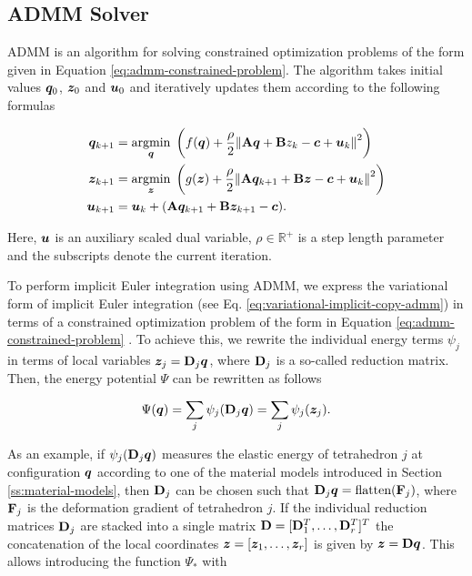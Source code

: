 \subsection{ADMM Solver}\label{ss:admm-solver}
ADMM is an algorithm for solving constrained optimization problems of the form given in Equation \ref{eq:admm-constrained-problem}. The algorithm takes initial values 
$\bm{q}_0$, $\bm{z}_0$ and $\bm{u}_0$ and iteratively updates them according to the following formulas \cite{gallier2020}

\begin{align}\label{eq:admm-general}
    \begin{split}
        \bm{q}_{k+1} &= \underset{\bm{q}}{\operatorname{argmin}}\; \left( f(\bm{q}) + \frac{\rho}{2}\norm{\mathbf{A}\bm{q} + \mathbf{B}{z}_k - \bm{c} + \bm{u}_k}^2 \right)\\ 
        \bm{z}_{k+1} &= \underset{\bm{z}}{\operatorname{argmin}}\; \left( g(\bm{z}) + \frac{\rho}{2}\norm{\mathbf{A}\bm{q}_{k+1} + \mathbf{B}\bm{z} - \bm{c} + \bm{u}_k}^2 \right)\\
        \bm{u}_{k+1} &= \bm{u}_{k} + (\mathbf{A}\bm{q}_{k+1} + \mathbf{B}\bm{z}_{k+1} - \bm{c}).
    \end{split}
\end{align}

\noindent Here, $\bm{u}$ is an auxiliary scaled dual variable, $\rho \in \mathbb{R}^+$ is a step length parameter and the subscripts denote the current iteration.

To perform implicit Euler integration using ADMM, we express the variational form of implicit Euler integration (see Eq. \ref{eq:variational-implicit-copy-admm}) in 
terms of a constrained optimization problem of the form in Equation \ref{eq:admm-constrained-problem} \cite{overby2017}. To achieve this, we rewrite the individual energy terms 
$\psi_j$ in terms of local variables $\bm{z}_j = \mathbf{D}_j\bm{q}$, where $\mathbf{D}_j$ is a so-called reduction matrix. Then, the energy potential 
$\Psi$ can be rewritten as follows

\[
    \Psi({\bm{q}}) = \sum_j \psi_j(\mathbf{D}_j \bm{q}) = \sum_j \psi_j(\bm{z}_j).
\]

\noindent As an example, if $\psi_j(\mathbf{D}_j\bm{q})$ measures the elastic energy of tetrahedron $j$ at configuration $\bm{q}$ according to one of the material 
models introduced in Section \ref{ss:material-models}, then $\mathbf{D}_j$ can be chosen such that $\mathbf{D}_j\bm{q} = \text{flatten}(\mathbf{F}_j)$, where $\mathbf{F}_j$
is the deformation gradient of tetrahedron $j$. If the individual reduction matrices $\mathbf{D}_j$ are stacked into a single matrix 
$\mathbf{D} = [\mathbf{D}^T_1, \ldots, \mathbf{D}^T_r]^T$ the concatenation of the local coordinates $\bm{z} = [\bm{z}_1, \ldots, \bm{z}_r]$ is given by 
$\bm{z} = \mathbf{D}\bm{q}$. This allows introducing the function $\Psi_*$ with 

